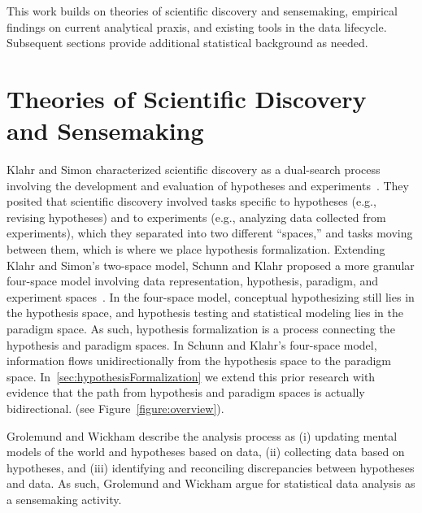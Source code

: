 This work builds on theories of scientific discovery and sensemaking, empirical
findings on current analytical praxis, and existing tools in the data lifecycle.
Subsequent sections provide additional statistical background as needed.

\section{Theories of Scientific Discovery and Sensemaking}
Klahr and Simon characterized scientific discovery as a dual-search process
involving the development and evaluation of hypotheses and
experiments~\cite{klahr1988dual}. They posited that scientific discovery
involved tasks specific to hypotheses (e.g., revising hypotheses) and to
experiments (e.g., analyzing data collected from experiments), which they
separated into two different ``spaces,'' and tasks moving between them, which is
where we place hypothesis formalization. Extending Klahr and Simon's two-space
model, Schunn and Klahr proposed a more granular four-space model involving data
representation, hypothesis, paradigm, and experiment
spaces~\cite{schunn1995FourSpace,schunn1996BeyondTwoSpace}. In the four-space
model, conceptual hypothesizing still lies in the hypothesis space, and
hypothesis testing and statistical modeling lies in the paradigm space. As such,
hypothesis formalization is a process connecting the hypothesis and paradigm
spaces. In Schunn and Klahr's four-space model, information flows
unidirectionally from the hypothesis space to the paradigm space.
In~\autoref{sec:hypothesisFormalization} we extend this prior research with
evidence that the path from hypothesis and paradigm spaces is actually
bidirectional. (see Figure~\ref{figure:overview}).


Grolemund and Wickham describe the analysis process as (i) updating mental
models of the world and hypotheses based on data, (ii) collecting data based on
hypotheses, and (iii) identifying and reconciling discrepancies between
hypotheses and data\cite{grolemund2014cognitive}. As such, Grolemund and
Wickham argue for statistical data analysis as a sensemaking activity. 

